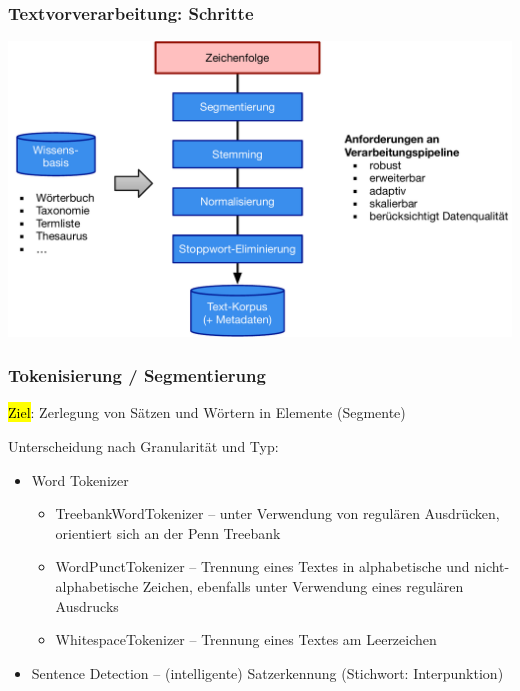 \begin{frame}
    \frametitle{Textvorverarbeitung: Schritte}

    \centering\includegraphics[width=\textwidth]{fig8/text-preprocessing.pdf}

\end{frame}


\begin{frame}
    \frametitle{Tokenisierung / Segmentierung}
    
    \hl{Ziel}: Zerlegung von Sätzen und Wörtern in Elemente (Segmente)

    Unterscheidung nach Granularität und Typ:
    \begin{itemize}
    \item Word Tokenizer
    \begin{itemize}
        \item TreebankWordTokenizer -- unter Verwendung von regulären Ausdrücken, orientiert sich an der Penn Treebank
        \item WordPunctTokenizer -- Trennung eines Textes in alphabetische und nicht-alphabetische Zeichen, ebenfalls unter Verwendung eines regulären Ausdrucks
        \item WhitespaceTokenizer -- Trennung eines Textes am Leerzeichen
    \end{itemize}
    \item Sentence Detection -- (intelligente) Satzerkennung (Stichwort: Interpunktion)
    \end{itemize}
\end{frame}
    
    
